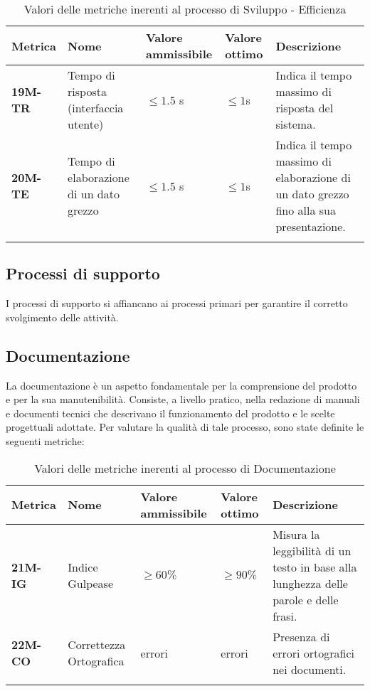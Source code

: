 \begin{longtable}{|>{\raggedright\arraybackslash}m{}|>{\raggedright\arraybackslash}m{}|>{\raggedright\arraybackslash}m{}|>{\raggedright\arraybackslash}m{}|>{\raggedright\arraybackslash}m{}|}
	\hline
	\textbf{Metrica}  & \textbf{Nome}                & \textbf{Valore ammissibile} & \textbf{Valore ottimo} & \textbf{Descrizione}\\
	\hline
	\endhead
	\textbf{19M-TR}  & Tempo di risposta (interfaccia utente)  & $\leq 1.5$ s                 & $\leq 1$s              & Indica il tempo massimo di risposta del sistema.                                       \\
	\hline
	\textbf{20M-TE}  & Tempo di elaborazione di un dato grezzo & $\leq 1.5$ s                 & $\leq 1$s              & Indica il tempo massimo di elaborazione di un dato grezzo fino alla sua presentazione. \\
	\hline
	\caption{ Valori delle metriche inerenti al processo di Sviluppo - Efficienza}
	\label{table:6}
\end{longtable}


\subsection{Processi di supporto}
I processi di supporto si affiancano ai processi primari per garantire il corretto svolgimento delle attività.
\subsection{Documentazione}
La documentazione è un aspetto fondamentale per la comprensione del prodotto e per la sua manutenibilità. Consiste,
a livello pratico, nella redazione di manuali e documenti tecnici che descrivano il funzionamento del prodotto e le
scelte progettuali adottate.
Per valutare la qualità di tale processo, sono state definite le seguenti metriche:
\begin{longtable}{|>{\raggedright\arraybackslash}m{}|>{\raggedright\arraybackslash}m{}|>{\raggedright\arraybackslash}m{}|>{\raggedright\arraybackslash}m{}|>{\raggedright\arraybackslash}m{}|}
	\hline
	\textbf{Metrica} & \textbf{Nome}           & \textbf{Valore ammissibile} & \textbf{Valore ottimo} & \textbf{Descrizione}                                                                 \\
	\hline
	\endfirsthead
	\textbf{21M-IG}  & Indice Gulpease         & $\geq 60\% $                & $\geq 90\% $           & Misura la leggibilità di un testo in base alla lunghezza delle parole e delle frasi. \\
	\hline
	\textbf{22M-CO}  & Correttezza Ortografica & 0 errori                    & 0 errori               & Presenza di errori ortografici nei documenti.                                        \\
	\hline
	\caption{ Valori delle metriche inerenti al processo di Documentazione}
	\label{table:7}
\end{longtable}

